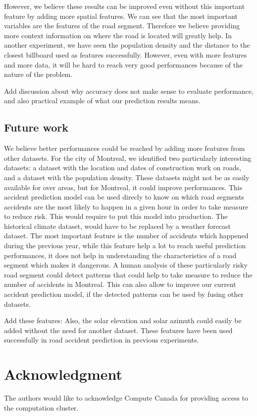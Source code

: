 \documentclass[conference]{IEEEtran}
\begin{document}
However, we believe these results can be improved even without this important feature by adding more spatial features.
We can see that the most important variables are the features of the road segment.
Therefore we believe providing more context information on where the road is located will greatly help.
In another experiment, we have seen the population density and the distance to the closest billboard used as features successfully.
However, even with more features and more data, it will be hard to reach very good performances because of the nature of the problem.

Add discussion about why accuracy does not make sense to evaluate performance, and also practical example of what our prediction results means.

\subsection{Future work}
We believe better performances could be reached by adding more features from other datasets.
For the city of Montreal, we identified two particularly interesting datasets: a dataset with the location and dates of construction work on roads, and a dataset with the population density.
These datasets might not be as easily available for over areas, but for Montreal, it could improve performances.
This accident prediction model can be used direcly to know on which road segments accidents are the most likely to happen in a given hour in order to take measure to reduce risk.
This would require to put this model into production.
The historical climate dataset, would have to be replaced by a weather forecast dataset.
The most important feature is the number of accidents which happened during the previous year, while this feature help a lot to reach useful prediction performances, it does not help in understanding the characteristics of a road segment which makes it dangerous.
A human analysis of these particularly risky road segment could detect patterns that could help to take measure to reduce the number of accidents in Montreal.
This can also allow to improve our current accident prediction model, if the detected patterns can be used by fusing other datasets.

Add these features:
Also, the solar elevation and solar azimuth could easily be added without the need for another dataset.
These features have been used successfully in road accident prediction in previous experiments.

\section*{Acknowledgment}

The authors would like to acknowledge Compute Canada for providing access to the computation cluster.



\end{document}
